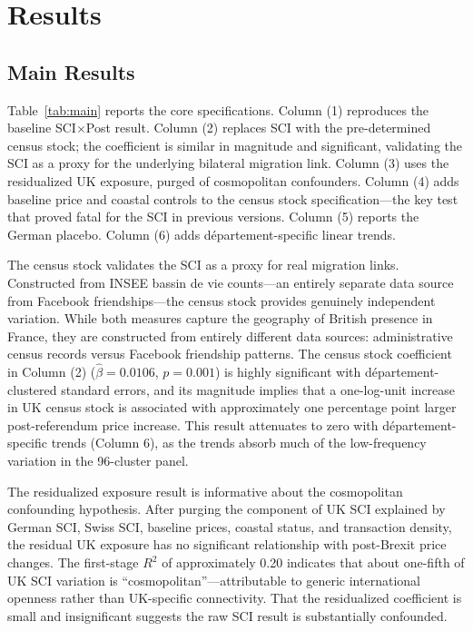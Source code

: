 \documentclass[12pt]{article}
\begin{document}



\section{Results}\label{sec:results}

\subsection{Main Results}

Table~\ref{tab:main} reports the core specifications. Column (1) reproduces the baseline SCI$\times$Post result. Column (2) replaces SCI with the pre-determined census stock; the coefficient is similar in magnitude and significant, validating the SCI as a proxy for the underlying bilateral migration link. Column (3) uses the residualized UK exposure, purged of cosmopolitan confounders. Column (4) adds baseline price and coastal controls to the census stock specification---the key test that proved fatal for the SCI in previous versions. Column (5) reports the German placebo. Column (6) adds d\'epartement-specific linear trends.

{\footnotesize}

The census stock validates the SCI as a proxy for real migration links. Constructed from INSEE bassin de vie counts---an entirely separate data source from Facebook friendships---the census stock provides genuinely independent variation. While both measures capture the geography of British presence in France, they are constructed from entirely different data sources: administrative census records versus Facebook friendship patterns. The census stock coefficient in Column (2) ($\hat{\beta} = 0.0106$, $p = 0.001$) is highly significant with d\'epartement-clustered standard errors, and its magnitude implies that a one-log-unit increase in UK census stock is associated with approximately one percentage point larger post-referendum price increase. This result attenuates to zero with d\'epartement-specific trends (Column 6), as the trends absorb much of the low-frequency variation in the 96-cluster panel.

The residualized exposure result is informative about the cosmopolitan confounding hypothesis. After purging the component of UK SCI explained by German SCI, Swiss SCI, baseline prices, coastal status, and transaction density, the residual UK exposure has no significant relationship with post-Brexit price changes. The first-stage $R^2$ of approximately 0.20 indicates that about one-fifth of UK SCI variation is ``cosmopolitan''---attributable to generic international openness rather than UK-specific connectivity. That the residualized coefficient is small and insignificant suggests the raw SCI result is substantially confounded.
\end{document}

